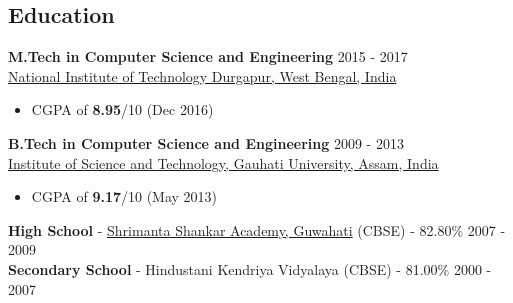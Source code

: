 \documentclass[margin, centered]{res}
\begin{document}
\begin{resume}

\section{Education}
\textbf{M.Tech in Computer Science and Engineering} \hfill 2015 - 2017 \\
\href{http://www.nitdgp.ac.in/}{National Institute of Technology Durgapur, West Bengal, India}
\begin{itemize}
 \item CGPA of \textbf{8.95}/10 (Dec 2016)
\end{itemize}
\textbf{B.Tech in Computer Science and Engineering} \hfill 2009 - 2013 \\
\href{http://www.gauhati.ac.in/}{Institute of Science and Technology, Gauhati University, Assam, India}
\begin{itemize}
 \item CGPA of \textbf{9.17}/10 (May 2013)
\end{itemize}
\textbf{High School} - \href{http://www.ssa-school.org/}{Shrimanta Shankar Academy, Guwahati} (CBSE) - 82.80\% \hfill 2007 - 2009 \\
\textbf{Secondary School} - Hindustani Kendriya Vidyalaya (CBSE) - 81.00\% \hfill 2000 - 2007
 

\end{resume}
\end{document}
